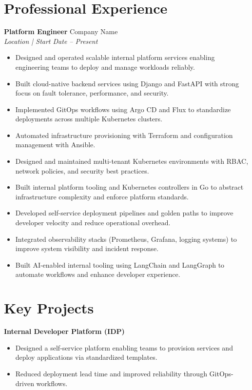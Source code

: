 \documentclass[11pt,a4paper]{article}
\begin{document}
\vspace{6pt}

\section*{Professional Experience}

\textbf{Platform Engineer} \hfill Company Name \\
\textit{Location \quad | \quad Start Date -- Present}

\begin{itemize}[leftmargin=*, itemsep=4pt]
    \item Designed and operated scalable internal platform services enabling engineering teams to deploy and manage workloads reliably.
    \item Built cloud-native backend services using Django and FastAPI with strong focus on fault tolerance, performance, and security.
    \item Implemented GitOps workflows using Argo CD and Flux to standardize deployments across multiple Kubernetes clusters.
    \item Automated infrastructure provisioning with Terraform and configuration management with Ansible.
    \item Designed and maintained multi-tenant Kubernetes environments with RBAC, network policies, and security best practices.
    \item Built internal platform tooling and Kubernetes controllers in Go to abstract infrastructure complexity and enforce platform standards.
    \item Developed self-service deployment pipelines and golden paths to improve developer velocity and reduce operational overhead.
    \item Integrated observability stacks (Prometheus, Grafana, logging systems) to improve system visibility and incident response.
    \item Built AI-enabled internal tooling using LangChain and LangGraph to automate workflows and enhance developer experience.
\end{itemize}

\vspace{6pt}

\section*{Key Projects}

\textbf{Internal Developer Platform (IDP)} \\
\begin{itemize}[leftmargin=*, itemsep=4pt]
    \item Designed a self-service platform enabling teams to provision services and deploy applications via standardized templates.
    \item Reduced deployment lead time and improved reliability through GitOps-driven workflows.
\end{itemize}
\end{document}
